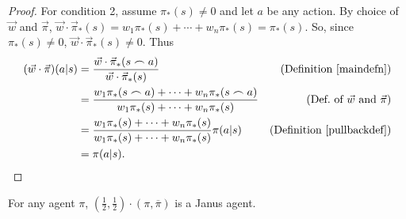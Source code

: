 \documentclass[runningheads]{llncs}
\begin{document}
\begin{proof}
        For condition 2,
        assume $\pi_*(s)\not=0$ and let $a$ be any action.
        By choice of $\vec w$ and $\vec\pi$,
        $\vec w\cdot\vec\pi_*(s)=w_1\pi_*(s)+\cdots+w_n\pi_*(s)=\pi_*(s)$.
        So, since $\pi_*(s)\not=0$, $\vec w\cdot\vec\pi_*(s)\not=0$.
        Thus
        \begin{align*}
            (\vec w\cdot\vec\pi)(a|s)
                &= \frac{\vec w\cdot \vec\pi_*(s\frown a)}{\vec w\cdot\vec\pi_*(s)}
                    &\mbox{(Definition \ref{maindefn})}\\
                &= \frac{w_1\pi_*(s\frown a)+\cdots+w_n\pi_*(s\frown a)}
                    {w_1\pi_*(s)+\cdots+w_n\pi_*(s)}
                    &\mbox{(Def.\ of $\vec w$ and $\vec\pi$)}\\
                &= \frac{w_1\pi_*(s)+\cdots+w_n\pi_*(s)}{w_1\pi_*(s)+\cdots+w_n\pi_*(s)}
                    \pi(a|s)
                    &\mbox{(Definition \ref{pullbackdef})}\\
                &= \pi(a|s).
        \end{align*}
\end{proof}

\begin{lemma}
\label{reflectionmakesjanuslemma}
    For any agent $\pi$,
    $(\frac12,\frac12)\cdot(\pi,\overline\pi)$ is a Janus agent.
\end{lemma}
\end{document}
